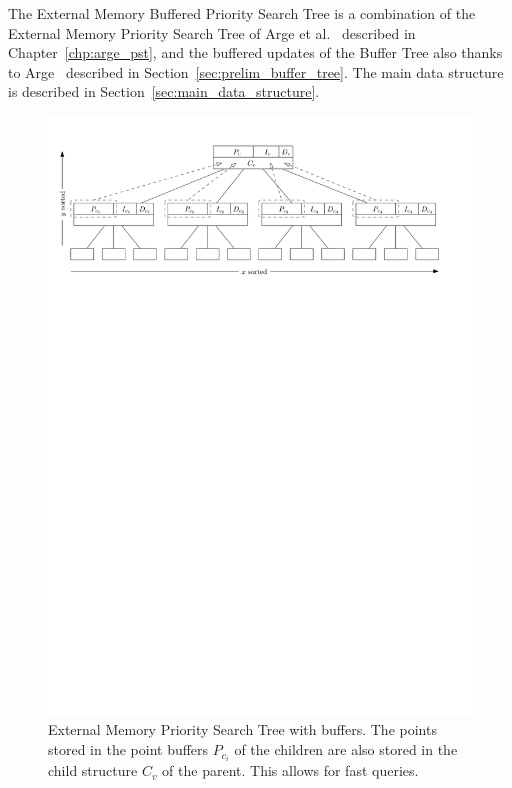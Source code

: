 \documentclass[twoside,11pt,openright]{report}
\begin{document}
The External Memory Buffered Priority Search Tree is a combination of the External Memory Priority Search Tree of Arge et al.~\cite{arge_samoladas_vitter_1999} described in Chapter~\ref{chp:arge_pst}, and the buffered updates of the Buffer Tree also thanks to Arge~\cite{Arge:1995:BTN:645930.672850} described in Section~\ref{sec:prelim_buffer_tree}. The main data structure is described in Section~\ref{sec:main_data_structure}.

\begin{figure}
	\centering
	\includegraphics[width=\textwidth]{../figures/gerth_tree}
	\caption{External Memory Priority Search Tree with buffers. The points stored in the point buffers $P_{c_i}$ of the children are also stored in the child structure $C_v$ of the parent. This allows for fast queries.}
	\label{fig:gerth_tree}
\end{figure}
\end{document}

